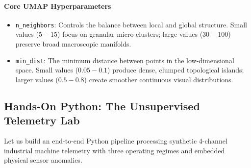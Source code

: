 \paragraph{Core UMAP Hyperparameters}
\begin{itemize}
    \item \texttt{n\_neighbors}: Controls the balance between local and global structure. Small values ($5-15$) focus on granular micro-clusters; large values ($30-100$) preserve broad macroscopic manifolds.
    \item \texttt{min\_dist}: The minimum distance between points in the low-dimensional space. Small values ($0.05-0.1$) produce dense, clumped topological islands; larger values ($0.5-0.8$) create smoother continuous visual distributions.
\end{itemize}

\subsection{Hands-On Python: The Unsupervised Telemetry Lab}\label{subsec:unsupervised_python}

Let us build an end-to-end Python pipeline processing synthetic 4-channel industrial machine telemetry with three operating regimes and embedded physical sensor anomalies.

